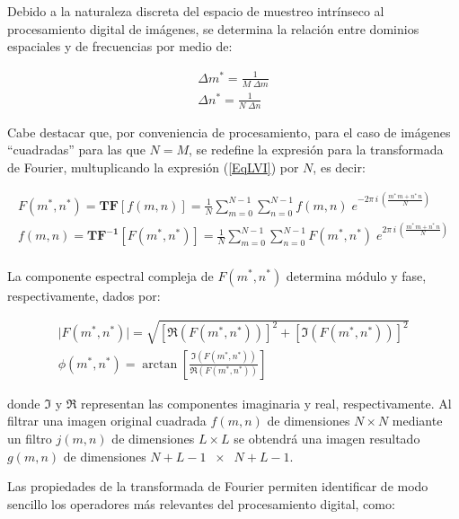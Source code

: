 Debido a la naturaleza discreta del espacio de muestreo intr\'inseco al procesamiento digital de im\'agenes, se determina la relaci\'on entre dominios 
espaciales y de frecuencias por medio de:

\begin{eqnarray}
	\Delta m^* = \frac{1}{M\; \Delta m}  \\
	\Delta n^* = \frac{1}{N\; \Delta n}
\label{EqLVII}
\end{eqnarray}

Cabe destacar que, por conveniencia de procesamiento, para el caso de im\'agenes ``cuadradas'' para las que $N = M$, se redefine la expresi\'on para la 
transformada de Fourier, multuplicando la expresi\'on (\ref{EqLVI}) por $N$, es decir:

\begin{eqnarray}
	F(m^*, n^*) = \mathbf{TF}[f(m, n)] = \frac{1}{N} \sum_{m=0}^{N-1} \sum_{n=0}^{N-1} f(m, n) \; 
	e^{-2 \pi \, i \, \left( \frac{m^* \, m + n^* \, n}{N} \right)} \nonumber \\
	f(m, n) = \mathbf{TF^{-1}} [F(m^*, n^*)] = \frac{1}{N} \sum_{m=0}^{N-1} \sum_{n=0}^{N-1} F(m^*, n^*) \; 
	e^{2 \pi \, i \, \left( \frac{m^* \, m + n^* \, n}{N} \right)} \nonumber \\
\label{EqLVIII}
\end{eqnarray}

La componente espectral compleja de $F(m^*, n^*)$ determina m\'odulo y fase, respectivamente, dados por:

\begin{eqnarray}
	\lvert F(m^*, n^*) \rvert = \sqrt{\left[ \Re{ \left( F(m^*, n^*) \right) }\right]^{2} + 
	\left[ \Im{\left( F(m^*, n^*) \right) } \right]^{2}} \nonumber \\ 
	\phi(m^*, n^*) = \arctan \left[ \frac{\Im{\left( F(m^*, n^*) \right) }}{\Re{\left( F(m^*, n^*) \right) }}\right]
\label{EqLIX}
\end{eqnarray}

donde $\Im$ y $\Re$ representan las componentes imaginaria y real, respectivamente.
%
Al filtrar una imagen original cuadrada $f(m, n)$ de dimensiones $N \times N$ mediante un filtro $j(m, n)$ de dimensiones $L \times L$ se obtendr\'a una 
imagen resultado $g(m, n)$ de dimensiones $N + L -1 \; \; \times \; \; N + L -1$.
%

%
Las propiedades de la transformada de Fourier permiten identificar de modo sencillo los operadores m\'as relevantes del procesamiento digital, como:
%

\vspace{1.0cm}

